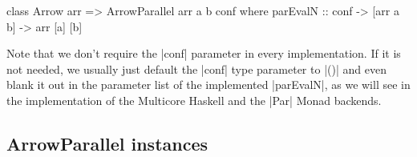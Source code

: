 \begin{code}
class Arrow arr => ArrowParallel arr a b conf where
	parEvalN :: conf -> [arr a b] -> arr [a] [b]
\end{code}
Note that we don't require the |conf| parameter in every implementation. If it is not needed, we usually just default the |conf| type parameter to |()| and even blank it out in the parameter list of the implemented |parEvalN|, as we will see in the implementation of the Multicore Haskell and the |Par| Monad backends.

\subsection{ArrowParallel instances}

